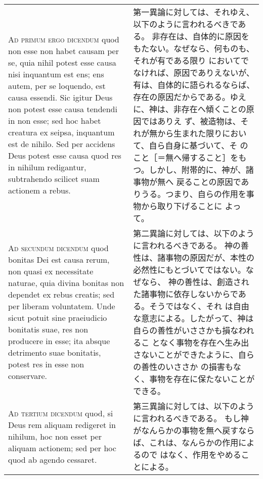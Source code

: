 \documentclass[10pt]{jsarticle} %
\begin{document}
\begin{longtable}{p{21em}p{21em}}
\\


{\scshape Ad primum ergo dicendum} quod non esse non
habet causam per se, quia nihil potest esse causa nisi inquantum est
ens; ens autem, per se loquendo, est causa essendi. Sic igitur Deus non
potest esse causa tendendi in non esse; sed hoc habet creatura ex
seipsa, inquantum est de nihilo. Sed per accidens Deus potest esse causa
quod res in nihilum redigantur, subtrahendo scilicet suam actionem a
rebus.

&


第一異論に対しては、それゆえ、以下のように言われるべきである。
非存在は、自体的に原因をもたない。なぜなら、何ものも、それが有である限り
 においてでなければ、原因でありえないが、有は、自体的に語られるならば、
 存在の原因だからである。ゆえに、神は、非存在へ傾くことの原因ではありえ
 ず、被造物は、それが無から生まれた限りにおいて、自ら自身に基づいて、そ
 のこと［＝無へ帰すること］をもつ。しかし、附帯的に、神が、諸事物が無へ
 戻ることの原因でありうる。つまり、自らの作用を事物から取り下げることに
 よって。

\\


{\scshape Ad secundum dicendum} quod bonitas Dei est
causa rerum, non quasi ex necessitate naturae, quia divina bonitas non
dependet ex rebus creatis; sed per liberam voluntatem. Unde sicut potuit
sine praeiudicio bonitatis suae, res non producere in esse; ita absque
detrimento suae bonitatis, potest res in esse non conservare.

&

第二異論に対しては、以下のように言われるべきである。
神の善性は、諸事物の原因だが、本性の必然性にもとづいてではない。なぜなら、
 神の善性は、創造された諸事物に依存しないからである。そうではなく、それ
 は自由な意志による。したがって、神は自らの善性がいささかも損なわれるこ
 となく事物を存在へ生み出さないことができたように、自らの善性のいささか
 の損害もなく、事物を存在に保たないことができる。


\\


{\scshape Ad tertium dicendum} quod, si Deus rem
aliquam redigeret in nihilum, hoc non esset per aliquam actionem; sed
per hoc quod ab agendo cessaret.


&

第三異論に対しては、以下のように言われるべきである。
もし神がなんらかの事物を無へ戻すならば、これは、なんらかの作用によるので
 はなく、作用をやめることによる。

\end{longtable}
\newpage
\end{document}
